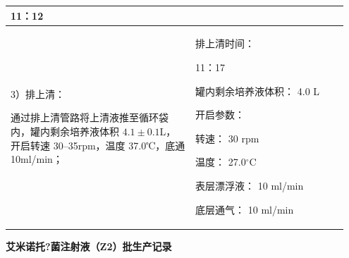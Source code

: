 \documentclass[UTF8,10pt,a4paper,fontset=fandol]{ctexart}
\newcommand{\fieldvalue}[1]{#1}
\newcommand{\handwritten}[1]{#1}
\begin{document}
\begin{tabular}{|p{0.52\linewidth}|p{0.43\linewidth}|}
\begin{minipage}[t]{0.40\linewidth}
\fieldvalue{\handwritten{11：12}}
\end{minipage}
\\
\hline
\begin{minipage}[t]{0.49\linewidth}
3）排上清：

通过排上清管路将上清液推至循环袋内，罐内剩余培养液体积
$4.1\pm0.1$L，开启转速 30--35rpm，温度 37.0℃，底通
10ml/min；
\end{minipage}
&
\begin{minipage}[t]{0.40\linewidth}
排上清时间：

\fieldvalue{\handwritten{11：17}}

罐内剩余培养液体积：
\fieldvalue{\handwritten{4.0}} L

开启参数：

转速：
\fieldvalue{\handwritten{30}} rpm

温度：
\fieldvalue{\handwritten{27.0}}${}^{\circ}$C

表层漂浮液：
\fieldvalue{\handwritten{10}} ml/min

底层通气：
\fieldvalue{\handwritten{10}} ml/min
\end{minipage}
\\
\hline
\end{tabular}


\newpage

\begin{center}
\textbf{艾米诺托?菌注射液（Z2）批生产记录}
\end{center}
\end{document}
